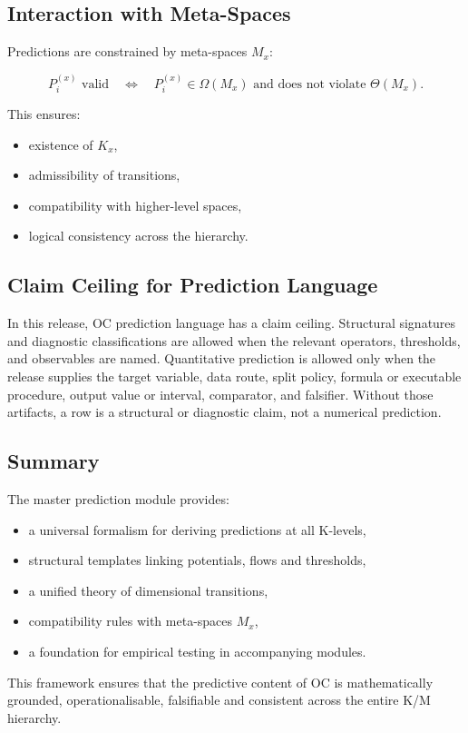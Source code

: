 \subsection{Interaction with Meta-Spaces}

Predictions are constrained by meta-spaces $M_x$:

\[
P^{(x)}_i \text{ valid}
\quad\Leftrightarrow\quad
P^{(x)}_i \in \Omega(M_x) \text{ and does not violate } \Theta(M_x).
\]

This ensures:

\begin{itemize}
    \item existence of $K_x$,
    \item admissibility of transitions,
    \item compatibility with higher-level spaces,
    \item logical consistency across the hierarchy.
\end{itemize}



\subsection{Claim Ceiling for Prediction Language}
\label{sec:predictions-claim-ceiling-v3}

In this release, OC prediction language has a claim ceiling. Structural
signatures and diagnostic classifications are allowed when the relevant
operators, thresholds, and observables are named. Quantitative prediction is
allowed only when the release supplies the target variable, data route, split
policy, formula or executable procedure, output value or interval, comparator,
and falsifier. Without those artifacts, a row is a structural or diagnostic
claim, not a numerical prediction.

\subsection{Summary}

The master prediction module provides:

\begin{itemize}
    \item a universal formalism for deriving predictions at all K-levels,
    \item structural templates linking potentials, flows and thresholds,
    \item a unified theory of dimensional transitions,
    \item compatibility rules with meta-spaces $M_x$,
    \item a foundation for empirical testing in accompanying modules.
\end{itemize}

This framework ensures that the predictive content of OC  
is mathematically grounded, operationalisable, falsifiable  
and consistent across the entire K/M hierarchy.
